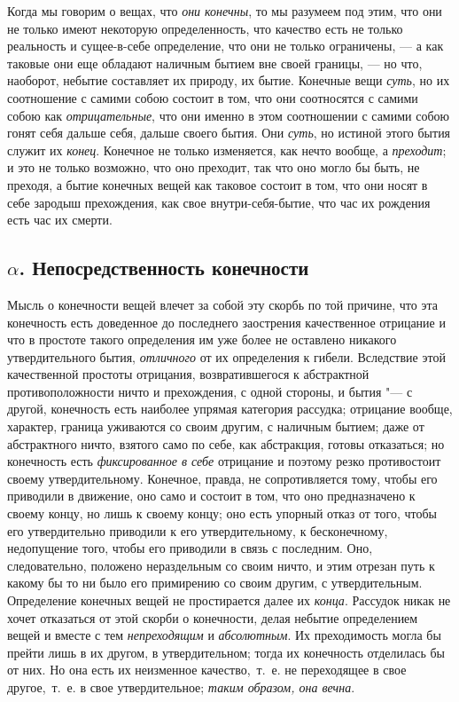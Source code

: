 Когда мы говорим о вещах, что {\em они конечны}, то мы
разумеем под этим, что они не только имеют некоторую определенность, что
качество есть не только реальность и сущее-в-себе определение, что они не
только ограничены, — а как таковые они еще обладают наличным бытием вне
своей границы, — но что, наоборот, небытие составляет их природу, их бытие.
Конечные вещи {\em суть}, но их соотношение с самими
собою состоит в том, что они соотносятся с самими собою как
{\em отрицательные}, что они именно в этом соотношении
с самими собою гонят себя дальше себя, дальше своего бытия. Они
{\em суть}, но истиной этого бытия служит их
{\em конец}. Конечное не только изменяется, как нечто
вообще, а {\em преходит}; и это не только возможно, что
оно преходит, так что оно могло бы быть, не преходя, а бытие конечных вещей
как таковое состоит в том, что они носят в себе зародыш прехождения, как
свое внутри-себя-бытие, что час их рождения есть час их смерти.

\subsection*{$\alpha $. Непосредственность конечности}

Мысль о конечности вещей влечет за собой эту скорбь по той причине, что эта
конечность есть доведенное до последнего заострения качественное отрицание
и что в простоте такого определения им уже более не оставлено никакого
утвердительного бытия, {\em отличного} от их
определения к гибели. Вследствие этой качественной простоты отрицания,
возвратившегося к абстрактной противоположности ничто и прехождения, с
одной стороны, и бытия "--- с другой, конечность есть наиболее упрямая
категория рассудка; отрицание вообще, характер, граница уживаются со своим
другим, с наличным бытием; даже от абстрактного ничто, взятого само по
себе, как абстракция, готовы отказаться; но конечность есть
{\em фиксированное в себе} отрицание и поэтому резко
противостоит своему утвердительному. Конечное, правда, не сопротивляется
тому, чтобы его приводили в движение, оно само и состоит в том, что оно
предназначено к своему концу, но лишь к своему концу; оно есть упорный
отказ от того, чтобы его утвердительно приводили к его утвердительному, к
бесконечному, недопущение того, чтобы его приводили в связь с последним.
Оно, следовательно, положено нераздельным со своим ничто, и этим отрезан
путь к какому бы то ни было его примирению со своим другим, с
утвердительным. Определение конечных вещей не простирается далее их
{\em конца}. Рассудок никак не хочет отказаться от этой
скорби о конечности, делая небытие определением вещей и вместе с тем
{\em непреходящим} и
{\em абсолютным}. Их преходимость могла бы прейти лишь
в их другом, в утвердительном; тогда их конечность отделилась бы от них. Но
она есть их неизменное качество,~т.~е. не переходящее в свое другое,~т.~е.
в свое утвердительное; {\em таким образом, она вечна}.

